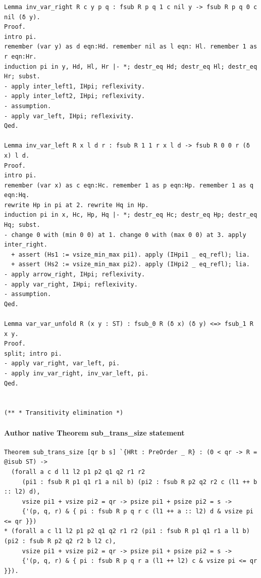 \begin{lstlisting}
Lemma inv_var_right R c y p q : fsub R p q 1 c nil y -> fsub R p q 0 c nil (δ y).
Proof.
intro pi.
remember (var y) as d eqn:Hd. remember nil as l eqn: Hl. remember 1 as r eqn:Hr.
induction pi in y, Hd, Hl, Hr |- *; destr_eq Hd; destr_eq Hl; destr_eq Hr; subst.
- apply inter_left1, IHpi; reflexivity.
- apply inter_left2, IHpi; reflexivity.
- assumption.
- apply var_left, IHpi; reflexivity.
Qed.

Lemma inv_var_left R x l d r : fsub R 1 1 r x l d -> fsub R 0 0 r (δ x) l d.
Proof.
intro pi.
remember (var x) as c eqn:Hc. remember 1 as p eqn:Hp. remember 1 as q eqn:Hq.
rewrite Hp in pi at 2. rewrite Hq in Hp.
induction pi in x, Hc, Hp, Hq |- *; destr_eq Hc; destr_eq Hp; destr_eq Hq; subst.
- change 0 with (min 0 0) at 1. change 0 with (max 0 0) at 3. apply inter_right.
  + assert (Hs1 := vsize_min_max pi1). apply (IHpi1 _ eq_refl); lia.
  + assert (Hs2 := vsize_min_max pi2). apply (IHpi2 _ eq_refl); lia.
- apply arrow_right, IHpi; reflexivity.
- apply var_right, IHpi; reflexivity.
- assumption.
Qed.

Lemma var_var_unfold R (x y : ST) : fsub_0 R (δ x) (δ y) <=> fsub_1 R x y.
Proof.
split; intro pi.
- apply var_right, var_left, pi.
- apply inv_var_right, inv_var_left, pi.
Qed.


(** * Transitivity elimination *)

\end{lstlisting}

\paragraph{Author native Theorem sub\_trans\_size statement}
\begin{lstlisting}
Theorem sub_trans_size [qr b s] `{HRt : PreOrder _ R} : (0 < qr -> R = @isub ST) ->
  (forall a c d l1 l2 p1 p2 q1 q2 r1 r2
     (pi1 : fsub R p1 q1 r1 a nil b) (pi2 : fsub R p2 q2 r2 c (l1 ++ b :: l2) d),
     vsize pi1 + vsize pi2 = qr -> psize pi1 + psize pi2 = s ->
     {'(p, q, r) & { pi : fsub R p q r c (l1 ++ a :: l2) d & vsize pi <= qr }})
* (forall a c l1 l2 p1 p2 q1 q2 r1 r2 (pi1 : fsub R p1 q1 r1 a l1 b) (pi2 : fsub R p2 q2 r2 b l2 c),
     vsize pi1 + vsize pi2 = qr -> psize pi1 + psize pi2 = s ->
     {'(p, q, r) & { pi : fsub R p q r a (l1 ++ l2) c & vsize pi <= qr }}).
\end{lstlisting}

